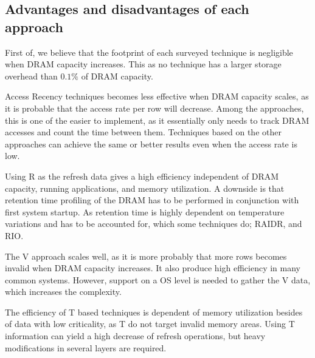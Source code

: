 \subsection{Advantages and disadvantages of each approach}
First of, we believe that the footprint of each surveyed technique is negligible when DRAM capacity increases. This as no technique has a larger storage overhead than $0.1\%$ of DRAM capacity.

Access Recency techniques becomes less effective when DRAM capacity scales, as it is probable that the access rate per row will decrease. Among the approaches, this is one of the easier to implement, as it essentially only needs to track DRAM accesses and count the time between them. Techniques based on the other approaches can achieve the same or better results even when the access rate is low.

Using R as the refresh data gives a high efficiency independent of DRAM capacity, running applications, and memory utilization. A downside is that retention time profiling of the DRAM has to be performed in conjunction with first system startup. As retention time is highly dependent on temperature variations and has to be accounted for, which some techniques do; RAIDR, and RIO. 

The V approach scales well, as it is more probably that more rows becomes invalid when DRAM capacity increases. It also produce high efficiency in many common systems. However, support on a OS level is needed to gather the V data, which increases the complexity. 

The efficiency of T based techniques is dependent of memory utilization besides of data with low criticality, as T do not target invalid memory areas. Using T information can yield a high decrease of refresh operations, but heavy modifications in several layers are required. 

